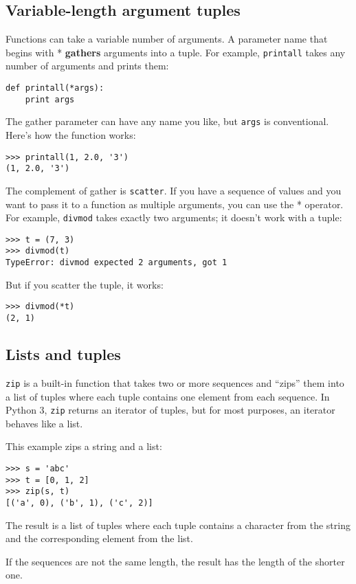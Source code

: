 \documentclass{article}
\begin{document}
\subsection{Variable-length argument tuples}
Functions can take a variable number of arguments. A parameter name
that begins with * \textbf{gathers} arguments into a tuple. For example,
\verb|printall| takes any number of arguments and prints them:
\begin{verbatim}
def printall(*args):
    print args
\end{verbatim}
The gather parameter can have any name you like, but \verb|args| is
conventional. Here’s how the function works:
\begin{verbatim}
>>> printall(1, 2.0, '3')
(1, 2.0, '3')
\end{verbatim}
The complement of gather is \verb|scatter|. If you have a sequence of
values and you want to pass it to a function as multiple
arguments, you can use the * operator. For example,
\verb|divmod| takes
exactly two arguments; it doesn’t work with a tuple:
\begin{verbatim}
>>> t = (7, 3)
>>> divmod(t)
TypeError: divmod expected 2 arguments, got 1
\end{verbatim}
But if you scatter the tuple, it works:
\begin{verbatim}
>>> divmod(*t)
(2, 1)
\end{verbatim}

\subsection{Lists and tuples}
\verb|zip| is a built-in function that takes two or more sequences and
``zips'' them into a list of tuples where each tuple contains one element from
each sequence. In Python 3, \verb|zip| returns an iterator of tuples, but for
most purposes, an iterator behaves like a list.

This example zips a string and a list:
\begin{verbatim}
>>> s = 'abc'
>>> t = [0, 1, 2]
>>> zip(s, t)
[('a', 0), ('b', 1), ('c', 2)]
\end{verbatim}
The result is a list of tuples where each tuple contains a character
from the string and the corresponding element from the list.

If the sequences are not the same length, the result has the length of
the shorter one.
\end{document}
